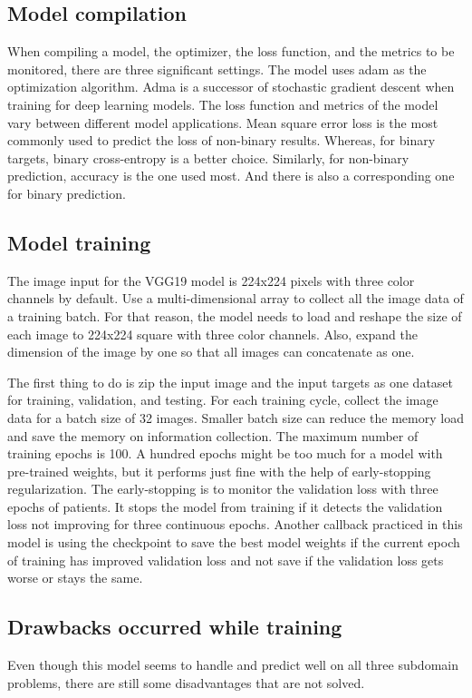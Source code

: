 \documentclass{article}
\begin{document}
\subsection{Model compilation}
When compiling a model, the optimizer, the loss function, and the metrics to be monitored, there are three significant settings. The model uses adam as the optimization algorithm. Adma is a successor of stochastic gradient descent when training for deep learning models. The loss function and metrics of the model vary between different model applications. Mean square error loss is the most commonly used to predict the loss of non-binary results. Whereas, for binary targets, binary cross-entropy is a better choice. Similarly, for non-binary prediction, accuracy is the one used most. And there is also a corresponding one for binary prediction.

\subsection{Model training}
The image input for the VGG19 model is 224x224 pixels with three color channels by default. Use a multi-dimensional array to collect all the image data of a training batch. For that reason, the model needs to load and reshape the size of each image to 224x224 square with three color channels. Also, expand the dimension of the image by one so that all images can concatenate as one.   

The first thing to do is zip the input image and the input targets as one dataset for training, validation, and testing. For each training cycle, collect the image data for a batch size of 32 images. Smaller batch size can reduce the memory load and save the memory on information collection. The maximum number of training epochs is 100. A hundred epochs might be too much for a model with pre-trained weights, but it performs just fine with the help of early-stopping regularization. The early-stopping is to monitor the validation loss with three epochs of patients. It stops the model from training if it detects the validation loss not improving for three continuous epochs.  Another callback practiced in this model is using the checkpoint to save the best model weights if the current epoch of training has improved validation loss and not save if the validation loss gets worse or stays the same. 

\subsection{Drawbacks occurred while training}
Even though this model seems to handle and predict well on all three subdomain problems, there are still some disadvantages that are not solved.
\end{document}
